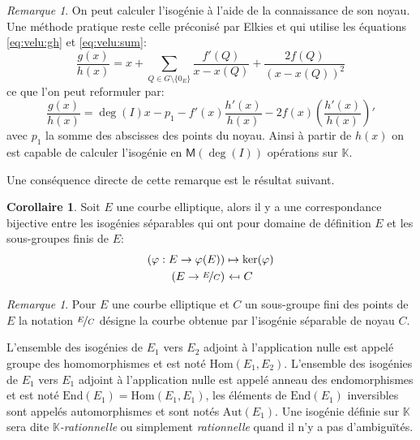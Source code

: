 \documentclass[10pt,a4paper]{book}
\theoremstyle{plain}
\theoremstyle{definition}
\theoremstyle{definition}
\newtheorem{cor}[thm]{Corollaire}
\theoremstyle{definition}
\theoremstyle{definition}
\theoremstyle{remark}
\newtheorem{rem}[thm]{Remarque}
\theoremstyle{remark}
\theoremstyle{definition}
\begin{document}
\begin{rem}
On peut calculer l'isogénie à l'aide de la connaissance de son noyau. Une méthode pratique reste celle préconisé par Elkies \cite{elkies1998} et \cite[Section 2.4]{Kohel96}  qui utilise les équations \eqref{eq:velu:gh} et \eqref{eq:velu:sum}:
\begin{equation*}
\frac{g(x)}{h(x)}= x + \sum_{Q \in G \setminus \{0_E\}} \frac{f'(Q)}{x-x(Q)}+\frac{2f(Q)}{(x-x(Q))^2}
\end{equation*}
ce que l'on peut reformuler par:
\begin{equation}
\frac{g(x)}{h(x)}= \deg(I) x -p_1 - f'(x) \frac{h'(x)}{h(x)} -2f(x)  \left(\frac{h'(x)}{h(x)}\right)'
\end{equation}
avec $p_1$ la somme des abscisses des points du noyau. Ainsi à partir de $h(x)$ on est capable de calculer l'isogénie en $\mathsf{M}(\deg(I))$ opérations sur $\mathbb{K}$.
\end{rem}

Une conséquence directe de cette remarque est le résultat suivant.

\begin{cor}
Soit $E$ une courbe elliptique, alors il y a une correspondance bijective entre les isogénies séparables qui ont pour domaine de définition $E$ et les sous-groupes finis de $E$:
\begin{equation*}
\begin{alignedat}{1}
(\varphi :E\rightarrow \varphi(E)) &\mapsto  \ker(\varphi)  \\
 (E\rightarrow\nicefrac{E}{C})  &\  \reflectbox{$\mapsto$} \ C 
\end{alignedat}
\end{equation*}
\end{cor}

\begin{rem}
Pour $E$ une courbe elliptique et $C$ un sous-groupe fini des points de $E$ la notation $\nicefrac{E}{C}$ désigne la courbe obtenue par l'isogénie séparable de noyau $C$.
\end{rem}

L'ensemble des isogénies de $E_1$ vers $E_2$ adjoint à l'application nulle est appelé groupe des homomorphismes et est noté \emph{$\mathrm{Hom}(E_1,E_2)$}. L'ensemble des isogénies de $E_1$ vers $E_1$ adjoint à l'application nulle est appelé anneau des endomorphismes et est noté \emph{$\mathrm{End}(E_1)=\mathrm{Hom}(E_1,E_1)$}, les éléments de $\mathrm{End}(E_1)$ inversibles sont appelés automorphismes et sont notés \emph{$\mathrm{Aut}(E_1)$}. Une isogénie définie sur $\mathbb{K}$ sera dite \emph{$\mathbb{K}$-rationnelle} ou simplement \emph{rationnelle} quand il n'y a pas d'ambiguïtés.
\end{document}
